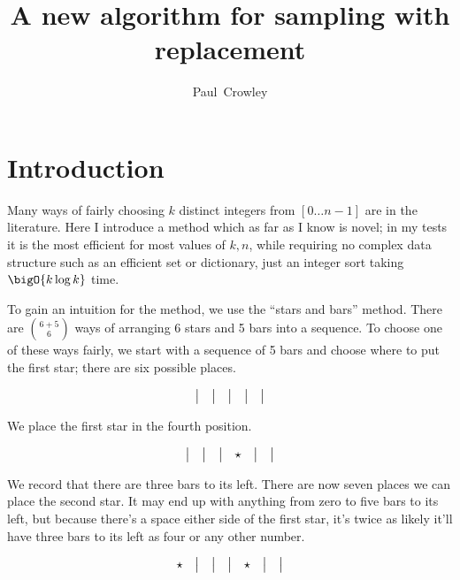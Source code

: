 \documentclass[letterpaper,luatex,11pt]{article}
\title{A new algorithm for sampling with replacement}
\author{Paul~Crowley}
\affil{Google LLC}
\begin{document}
\maketitle

\section{Introduction}

Many ways of fairly choosing $k$ distinct integers from $[0 \ldots n-1]$ are in the literature.
Here I introduce a method which as far as I know is novel; in my tests it is the most efficient
for most values of $k, n$, while requiring no complex data structure such as an efficient
set or dictionary, just an integer sort taking $\bigO{k \log k}$ time.

To gain an intuition for the method, we use the ``stars and bars'' method. There are
$\binom{6 + 5}{6}$ ways of arranging
6 stars and 5 bars into a sequence.
To choose one of these ways fairly, we start with a sequence of 5 bars and choose where to put
the first star; there are six possible places.

\begin{displaymath}
\begin{array}{ c c c c c }
    \big| & \big| & \big| & \big| & \big| \\
\end{array}
\end{displaymath}

We place the first star in the fourth position.

\begin{displaymath}
\begin{array}{ c c c c c c }
    \big| & \big| & \big| & \star & \big| & \big| \\
\end{array}
\end{displaymath}

We record that there are three bars to its left.
There are now seven places we can place the second star. It may end up with anything from zero to
five bars to its left, but because there's a space either side of the first star, it's
twice as likely it'll have three bars to its left as four or any other number.

\begin{displaymath}
\begin{array}{ c c c c c c c }
    \star & \big| & \big| & \big| & \star & \big| & \big| \\
\end{array}
\end{displaymath}
\end{document}

